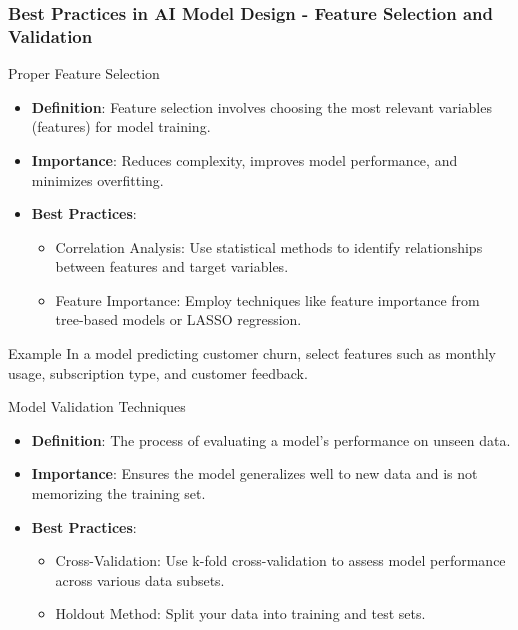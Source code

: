 \documentclass[aspectratio=169]{beamer}
\begin{document}
\begin{frame}[fragile]
    \frametitle{Best Practices in AI Model Design - Feature Selection and Validation}
    \begin{block}{Proper Feature Selection}
        \begin{itemize}
            \item \textbf{Definition}: Feature selection involves choosing the most relevant variables (features) for model training.
            \item \textbf{Importance}: Reduces complexity, improves model performance, and minimizes overfitting.
            \item \textbf{Best Practices}:
            \begin{itemize}
                \item Correlation Analysis: Use statistical methods to identify relationships between features and target variables.
                \item Feature Importance: Employ techniques like feature importance from tree-based models or LASSO regression.
            \end{itemize}
        \end{itemize}
        
        \begin{exampleblock}{Example}
            In a model predicting customer churn, select features such as monthly usage, subscription type, and customer feedback.
        \end{exampleblock}
    \end{block}
    
    \begin{block}{Model Validation Techniques}
        \begin{itemize}
            \item \textbf{Definition}: The process of evaluating a model's performance on unseen data.
            \item \textbf{Importance}: Ensures the model generalizes well to new data and is not memorizing the training set.
            \item \textbf{Best Practices}:
            \begin{itemize}
                \item Cross-Validation: Use k-fold cross-validation to assess model performance across various data subsets.
                \item Holdout Method: Split your data into training and test sets.
            \end{itemize}
        \end{itemize}
    \end{block}
\end{frame}
\end{document}
